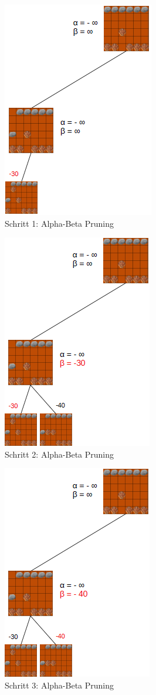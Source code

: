 \begin{figure}[h]
	\centering
	\includegraphics{img/ab1}
	\caption{Schritt 1: Alpha-Beta Pruning}
	\label{fig:ab1}
\end{figure}

\begin{figure}[h]
	\centering
	\includegraphics{img/ab2}
	\caption{Schritt 2: Alpha-Beta Pruning}
	\label{fig:ab2}
\end{figure}

\begin{figure}[h]
	\centering
	\includegraphics{img/ab3}
	\caption{Schritt 3: Alpha-Beta Pruning}
	\label{fig:ab3}
\end{figure}

